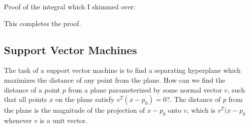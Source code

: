 \documentclass[12pt]{article}
\begin{document}

Proof of the integral which I skimmed over:


This completes the proof.

\subsection{Support Vector Machines}

The task of a support vector machine is to find a separating hyperplane which maximizes the distance of any point from the plane. How can we find the distance of a point $p$ from a plane parameterized by some normal vector $v$, such that all points $x$ on the plane satisfy $v^T(x-p_0) = 0$?. The distance of $p$ from the plane is the magnitude of the projection of $x-p_0$ onto $v$, which is $v^T(x-p_0$ whenever $v$ is a unit vector.
\end{document}
